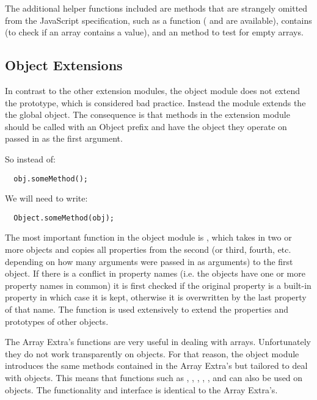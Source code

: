 The additional helper functions included are methods that are strangely omitted from the JavaScript specification, such as a  function ( and  are available), contains (to check if an array contains a value), and an  method to test for empty arrays.

\subsection{Object Extensions}
In contrast to the other extension modules, the object module does not extend the  prototype, which is considered bad practice\cite{arvidsson05}. Instead the module extends the the global  object. The consequence is that methods in the extension module should be called with an Object prefix and have the object they operate on passed in as the first argument.

So instead of:
\begin{verbatim}
  obj.someMethod();
\end{verbatim}
We will need to write:
\begin{verbatim}
  Object.someMethod(obj);
\end{verbatim}

The most important function in the object module is , which takes in two or more objects and copies all properties from the second (or third, fourth, etc. depending on how many arguments were passed in as arguments) to the first object. If there is a conflict in property names (i.e. the objects have one or more property names in common) it is first checked if the original property is a built-in property in which case it is kept, otherwise it is overwritten by the last property of that name. The  function is used extensively to extend the properties and prototypes of other objects.

The Array Extra's functions are very useful in dealing with arrays. Unfortunately they do not work transparently on objects. For that reason, the object module introduces the same methods contained in the Array Extra's but tailored to deal with objects. This means that functions such as , , , , , and  can also be used on objects. The functionality and interface is identical to the Array Extra's.

